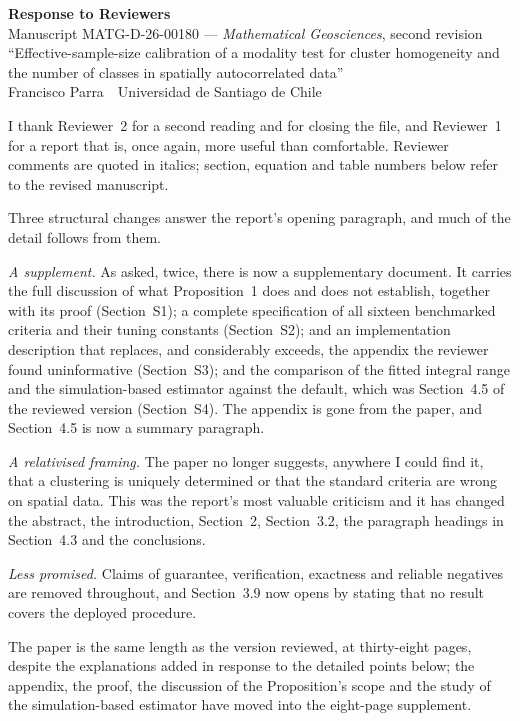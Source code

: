 \documentclass[11pt]{article}
\begin{document}
\begin{center}
{\LARGE\bfseries Response to Reviewers}\\[6pt]
{\large Manuscript MATG-D-26-00180 --- \emph{Mathematical Geosciences},
second revision}\\[4pt]
``Effective-sample-size calibration of a modality test for cluster homogeneity
and the number of classes in spatially autocorrelated data''\\[4pt]
Francisco Parra \,\textperiodcentered\, Universidad de Santiago de Chile
\end{center}
\medskip

I thank Reviewer~2 for a second reading and for closing the file, and
Reviewer~1 for a report that is, once again, more useful than comfortable.
Reviewer comments are quoted in italics; section, equation and table numbers
below refer to the revised manuscript.

Three structural changes answer the report's opening paragraph, and much of
the detail follows from them.

\emph{A supplement.} As asked, twice, there is now a supplementary document. It
carries the full discussion of what Proposition~1 does and does not establish,
together with its proof (Section~S1); a complete specification of all sixteen
benchmarked criteria and their tuning constants (Section~S2); and an
implementation description that replaces, and considerably exceeds, the
appendix the reviewer found uninformative (Section~S3); and the comparison of
the fitted integral range and the simulation-based estimator against the
default, which was Section~4.5 of the reviewed version (Section~S4). The
appendix is gone from the paper, and Section~4.5 is now a summary paragraph.

\emph{A relativised framing.} The paper no longer suggests, anywhere I could
find it, that a clustering is uniquely determined or that the standard criteria
are wrong on spatial data. This was the report's most valuable criticism and it
has changed the abstract, the introduction, Section~2, Section~3.2, the
paragraph headings in Section~4.3 and the conclusions.

\emph{Less promised.} Claims of guarantee, verification, exactness and reliable
negatives are removed throughout, and Section~3.9 now opens by stating that no
result covers the deployed procedure.

The paper is the same length as the version reviewed, at thirty-eight pages,
despite the explanations added in response to the detailed points below; the
appendix, the proof, the discussion of the Proposition's scope and the study of
the simulation-based estimator have moved into the eight-page supplement.
\end{document}
